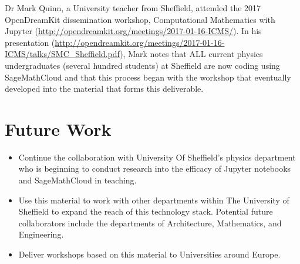 \documentclass{deliverablereport}
\begin{document}
Dr Mark Quinn, a University teacher from Sheffield, attended the 2017 OpenDreamKit dissemination workshop, Computational Mathematics with Jupyter (\url{http://opendreamkit.org/meetings/2017-01-16-ICMS/}). In his presentation (\url{http://opendreamkit.org/meetings/2017-01-16-ICMS/talks/SMC_Sheffield.pdf}), Mark notes that ALL current physics undergraduates (several hundred students) at Sheffield are now coding using SageMathCloud and that this process began with the workshop that eventually developed into the material that forms this deliverable.
\section{Future Work}
\begin{itemize}
\item Continue the collaboration with University Of Sheffield's physics department who is beginning to conduct research into the efficacy of Jupyter notebooks and SageMathCloud in teaching.
\item Use this material to work with other departments within The University of Sheffield to expand the reach of this technology stack. Potential future collaborators include the departments of Architecture, Mathematics, and Engineering.
\item Deliver workshops based on this material to Universities around Europe.
\end{itemize}
\end{document}
